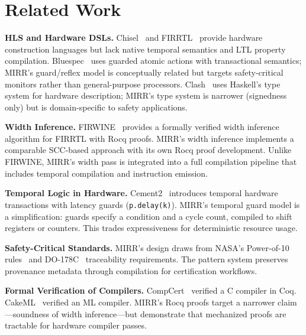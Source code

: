 \documentclass[conference]{IEEEtran}
\begin{document}
\section{Related Work}\label{sec:related}

\textbf{HLS and Hardware DSLs.}
Chisel~\cite{bachrach2012chisel} and FIRRTL~\cite{izraelevitz2017firrtl}
provide hardware construction languages but lack native temporal
semantics and LTL property compilation.  Bluespec~\cite{nikhil2004bluespec}
uses guarded atomic actions with transactional semantics; MIRR's
guard/reflex model is conceptually related but targets safety-critical
monitors rather than general-purpose processors.
Clash~\cite{baaij2010clash} uses Haskell's type system for hardware
description; MIRR's type system is narrower (signedness only) but is
domain-specific to safety applications.

\textbf{Width Inference.}
FIRWINE~\cite{wang2026firwine} provides a formally verified width
inference algorithm for FIRRTL with Rocq proofs.  MIRR's width inference
implements a comparable SCC-based approach with its own Rocq proof
development.  Unlike FIRWINE, MIRR's width pass is integrated into a
full compilation pipeline that includes temporal compilation and
instruction emission.

\textbf{Temporal Logic in Hardware.}
Cement2~\cite{xiao2025cement2} introduces temporal hardware transactions
with latency guards (\texttt{p.delay(k)}).  MIRR's temporal guard model
is a simplification: guards specify a condition and a cycle count,
compiled to shift registers or counters.  This trades expressiveness
for deterministic resource usage.

\textbf{Safety-Critical Standards.}
MIRR's design draws from NASA's Power-of-10
rules~\cite{holzmann2006power} and DO-178C~\cite{rtca2011do178c}
traceability requirements.  The pattern system preserves
provenance metadata through compilation for certification workflows.

\textbf{Formal Verification of Compilers.}
CompCert~\cite{leroy2009compcert} verified a C compiler in Coq.
CakeML~\cite{kumar2014cakeml} verified an ML compiler.  MIRR's Rocq
proofs target a narrower claim---soundness of width inference---but
demonstrate that mechanized proofs are tractable for hardware compiler passes.

\end{document}
